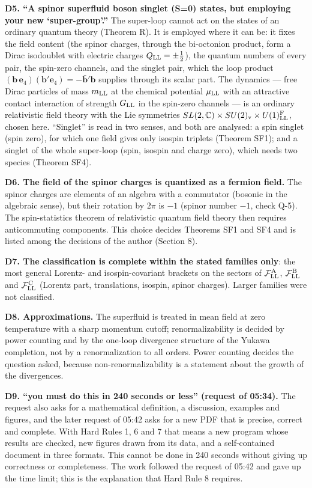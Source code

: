 \documentclass[
  10pt,
]{article}
\begin{document}
\textbf{D5. ``A spinor superfluid boson singlet (S=0) states, but
employing your new `super-group'.''} The super-loop cannot act on the
states of an ordinary quantum theory (Theorem R). It is employed where
it can be: it fixes the field content (the spinor charges, through the
bi-octonion product, form a Dirac isodoublet with electric charges
\(Q_{\rm LL}=\pm\tfrac12\)), the quantum numbers of every pair, the
spin-zero channels, and the singlet pair, which the loop product
\((\mathbf b\,\mathbf e_4)(\mathbf b'\mathbf e_4)=-\bar{\mathbf b}'\mathbf b\)
supplies through its scalar part. The dynamics --- free Dirac particles
of mass \(m_{\rm LL}\) at the chemical potential \(\mu_{\rm LL}\) with
an attractive contact interaction of strength \(G_{\rm LL}\) in the
spin-zero channels --- is an ordinary relativistic field theory with the
Lie symmetries
\(SL(2,\mathbb C)\times SU(2)_{\rm v}\times U(1)^{\rm F}_{\rm LL}\),
chosen here. ``Singlet'' is read in two senses, and both are analysed: a
spin singlet (spin zero), for which one field gives only isospin
triplets (Theorem SF1); and a singlet of the whole super-loop (spin,
isospin and charge zero), which needs two species (Theorem SF4).

\textbf{D6. The field of the spinor charges is quantized as a fermion
field.} The spinor charges are elements of an algebra with a commutator
(bosonic in the algebraic sense), but their rotation by \(2\pi\) is
\(-1\) (spinor number \(-1\), check Q-5). The spin-statistics theorem of
relativistic quantum field theory then requires anticommuting
components. This choice decides Theorems SF1 and SF4 and is listed among
the decisions of the author (Section 8).

\textbf{D7. The classification is complete within the stated families
only}: the most general Lorentz- and isospin-covariant brackets on the
sectors of \(\mathcal F^{\rm A}_{\rm LL}\),
\(\mathcal F^{\rm B}_{\rm LL}\) and \(\mathcal F^{\rm C}_{\rm LL}\)
(Lorentz part, translations, isospin, spinor charges). Larger families
were not classified.

\textbf{D8. Approximations.} The superfluid is treated in mean field at
zero temperature with a sharp momentum cutoff; renormalizability is
decided by power counting and by the one-loop divergence structure of
the Yukawa completion, not by a renormalization to all orders. Power
counting decides the question asked, because non-renormalizability is a
statement about the growth of the divergences.

\textbf{D9. ``you must do this in 240 seconds or less'' (request of
05:34).} The request also asks for a mathematical definition, a
discussion, examples and figures, and the later request of 05:42 asks
for a new PDF that is precise, correct and complete. With Hard Rules 1,
6 and 7 that means a new program whose results are checked, new figures
drawn from its data, and a self-contained document in three formats.
This cannot be done in 240 seconds without giving up correctness or
completeness. The work followed the request of 05:42 and gave up the
time limit; this is the explanation that Hard Rule 8 requires.
\end{document}
